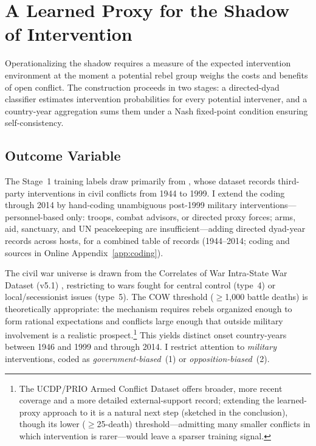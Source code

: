 
\section{A Learned Proxy for the Shadow of Intervention}
\label{sec:constructing}

Operationalizing the shadow requires a measure of the expected intervention
environment at the moment a potential rebel group weighs the costs and benefits
of open conflict.  The construction proceeds in two stages: a directed-dyad
classifier estimates intervention probabilities for every potential
intervener, and a country-year aggregation sums them under a Nash
fixed-point condition ensuring self-consistency.

\subsection{Outcome Variable}

The Stage~1 training labels draw primarily from \citet{regan2000},
whose dataset records third-party interventions in civil conflicts from 1944
to 1999.  I extend the coding through 2014 by hand-coding unambiguous
post-1999 military interventions---personnel-based only: troops, combat
advisors, or directed proxy forces; arms, aid, sanctuary, and UN peacekeeping
are insufficient---adding \PostExtInterventions{} directed dyad-year records
across \PostExtHosts{} hosts, for a combined table of
\CombinedInterventions{} records (1944--2014; coding and sources in Online
Appendix~\ref{app:coding}).

The civil war universe is drawn from the Correlates of War Intra-State War
Dataset (v5.1) \citep{dixon2016}, restricting to wars fought for central control
(type~4) or local/secessionist issues (type~5).  The COW threshold
($\geq$1,000 battle deaths) is theoretically appropriate: the mechanism requires
rebels organized enough to form rational expectations and conflicts large
enough that outside military involvement is a realistic prospect.\footnote{%
  The UCDP/PRIO Armed Conflict Dataset offers broader, more recent coverage and a
  more detailed external-support record; extending the learned-proxy approach to
  it is a natural next step (sketched in the conclusion), though its lower
  ($\geq$25-death) threshold---admitting many smaller conflicts in which
  intervention is rarer---would leave a sparser training signal.}
This yields \OnsetCYsColdWar{} distinct onset country-years between 1946 and 1999 and \OnsetCYsTotal{}
through 2014.  I restrict attention to \textit{military} interventions, coded as
\textit{government-biased}~(1) or \textit{opposition-biased}~(2).

